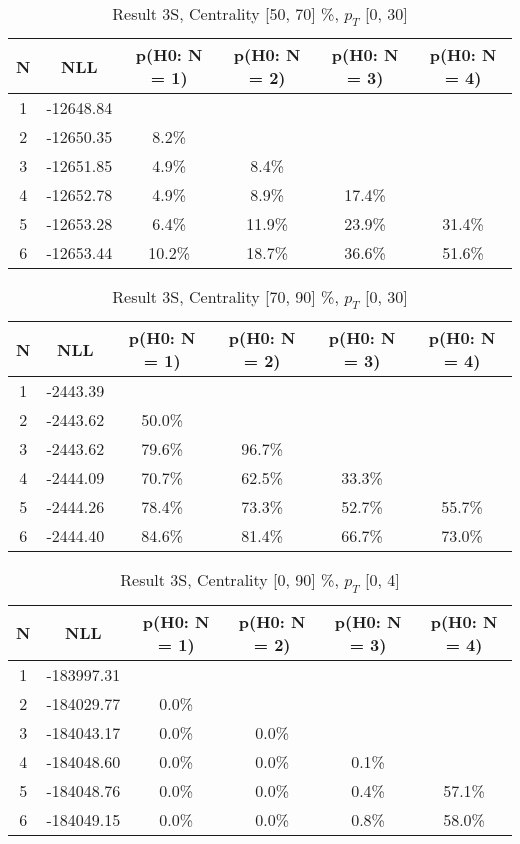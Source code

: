 \begin{table}[htb]
	\begin{center}
	\caption{Result 3S, Centrality [50, 70] \%, $p_{T}$ [0, 30] \GeV
}
{\footnotesize\renewcommand{\arraystretch}{1.4}
		\begin{tabular}{cc||cccc}
			N & NLL & p(H0: N = 1) & p(H0: N = 2) & p(H0: N = 3) & p(H0: N = 4)\\ 
		\hline
1 & -12648.84 & & & & \\
2 & -12650.35 & 8.2\% & & & \\
3 & -12651.85 & 4.9\% & 8.4\% & & \\
4 & -12652.78 & 4.9\% & 8.9\% & 17.4\% & \\
5 & -12653.28 & 6.4\% & 11.9\% & 23.9\% & 31.4\% \\
6 & -12653.44 & 10.2\% & 18.7\% & 36.6\% & 51.6\% \\
	\end{tabular}
		\label{tab:lab}
	}
	\end{center}\end{table}

\begin{table}[htb]
	\begin{center}
	\caption{Result 3S, Centrality [70, 90] \%, $p_{T}$ [0, 30] \GeV
}
{\footnotesize\renewcommand{\arraystretch}{1.4}
		\begin{tabular}{cc||cccc}
			N & NLL & p(H0: N = 1) & p(H0: N = 2) & p(H0: N = 3) & p(H0: N = 4)\\ 
		\hline
1 & -2443.39 & & & & \\
2 & -2443.62 & 50.0\% & & & \\
3 & -2443.62 & 79.6\% & 96.7\% & & \\
4 & -2444.09 & 70.7\% & 62.5\% & 33.3\% & \\
5 & -2444.26 & 78.4\% & 73.3\% & 52.7\% & 55.7\% \\
6 & -2444.40 & 84.6\% & 81.4\% & 66.7\% & 73.0\% \\
	\end{tabular}
		\label{tab:lab}
	}
	\end{center}\end{table}

\begin{table}[htb]
	\begin{center}
	\caption{Result 3S, Centrality [0, 90] \%, $p_{T}$ [0, 4] \GeV
}
{\footnotesize\renewcommand{\arraystretch}{1.4}
		\begin{tabular}{cc||cccc}
			N & NLL & p(H0: N = 1) & p(H0: N = 2) & p(H0: N = 3) & p(H0: N = 4)\\ 
		\hline
1 & -183997.31 & & & & \\
2 & -184029.77 & 0.0\% & & & \\
3 & -184043.17 & 0.0\% & 0.0\% & & \\
4 & -184048.60 & 0.0\% & 0.0\% & 0.1\% & \\
5 & -184048.76 & 0.0\% & 0.0\% & 0.4\% & 57.1\% \\
6 & -184049.15 & 0.0\% & 0.0\% & 0.8\% & 58.0\% \\
	\end{tabular}
		\label{tab:lab}
	}
	\end{center}\end{table}

